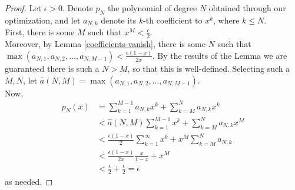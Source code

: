 \documentclass{article}
\theoremstyle{definition}
\theoremstyle{remark}
\numberwithin{equation}{section}
\begin{document}
\begin{proof}
Let $\epsilon > 0$. Denote $p_N$ the polynomial of degree $N$ obtained through our optimization, and let $a_{N,k}$ denote its $k$-th coefficient to $x^k$, where $k \le N$.\\
First, there is some $M$ such that $x^M < \frac{\epsilon}{2}$. \\
Moreover, by Lemma \ref{coefficients-vanish}, there is some $N$ such that $\max (a_{N,1}, a_{N,2},..., a_{N,M-1}) < \frac{\epsilon(1-x)}{2x}$. By the results of the Lemma we are guaranteed there is such a $N>M$, so that this is well-defined. Selecting such a $M, N$, let $\hat{a}(N,M) = \max (a_{N,1}, a_{N,2},..., a_{N,M-1}) $.\\
Now,
\begin{align*}
p_N(x) &= \sum_{k=1}^{M-1} a_{N,k} x^k + \sum_{k=M}^N a_{N,k}x ^k\\
&< \hat{a}(N,M) \sum_{k=1}^{M-1} x^ k + \sum_{k=M}^N a_{N,k} x^M \\
&< \frac{\epsilon(1-x)}{2} \sum_{k=1}^\infty x^k + x^M \sum_{k=M}^N a_{N,k}\\
& < \frac{\epsilon(1-x)}{2x} \frac{x}{1-x} + x^M \\
&< \frac{\epsilon}{2} + \frac{\epsilon}{2} = \epsilon
\end{align*}
as needed.
\end{proof}


  
  
\end{document}
